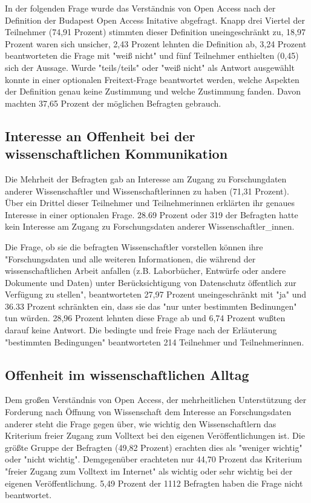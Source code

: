 In der folgenden Frage wurde das Verständnis von Open Access nach der Definition der Budapest Open Access Initative \cite{boai_2012} abgefragt. Knapp drei Viertel der Teilnehmer (74,91 Prozent) stimmten dieser Definition uneingeschränkt zu, 18,97 Prozent waren sich unsicher, 2,43 Prozent lehnten die Definition ab, 3,24 Prozent beantworteten die Frage mit "weiß nicht" und fünf Teilnehmer enthielten (0,45) sich der Aussage. Wurde "teils/teils" oder "weiß nicht" als Antwort ausgewählt konnte in einer optionalen Freitext-Frage beantwortet werden, welche Aspekten der Definition genau keine Zustimmung und welche Zustimmung fanden. Davon machten 37,65 Prozent der möglichen Befragten gebrauch.

\subsection{Interesse an Offenheit bei der wissenschaftlichen Kommunikation}

Die Mehrheit der Befragten gab an Interesse am Zugang zu Forschungdaten anderer Wissenschaftler und Wissenschaftlerinnen zu haben (71,31 Prozent). Über ein Drittel dieser Teilnehmer und Teilnehmerinnen erklärten ihr genaues Interesse in einer optionalen Frage. 28.69 Prozent oder 319 der Befragten hatte kein Interesse am Zugang zu Forschungsdaten anderer Wissenschaftler_innen.

Die Frage, ob sie die befragten Wissenschaftler vorstellen können ihre "Forschungsdaten und alle weiteren Informationen, die während der wissenschaftlichen Arbeit anfallen (z.B. Laborbücher, Entwürfe oder andere Dokumente und Daten) unter Berücksichtigung von Datenschutz öffentlich zur Verfügung zu stellen", beantworteten 27,97 Prozent uneingeschränkt mit "ja" und 36.33 Prozent schränkten ein, dass sie das "nur unter bestimmten Bedinungen" tun würden.  28,96 Prozent lehnten diese Frage ab und 6,74 Prozent wußten darauf keine Antwort. Die bedingte und freie Frage nach der Erläuterung "bestimmten Bedingungen" beantworteten 214 Teilnehmer und Teilnehmerinnen.

\subsection{Offenheit im wissenschaftlichen Alltag}

Dem großen Verständnis von Open Access, der mehrheitlichen Unterstützung der Forderung nach Öffnung von Wissenschaft dem Interesse an Forschungsdaten anderer steht die Frage gegen über, wie wichtig den Wissenschaftlern das Kriterium freier Zugang zum Volltext bei den eigenen Veröffentlichungen ist. Die größte Gruppe der Befragten (49,82 Prozent) erachten dies als "weniger wichtig" oder "nicht wichtig". Demgegenüber erachteten nur 44,70 Prozent das Kriterium "freier Zugang zum Volltext im Internet" als wichtig oder sehr wichtig bei der eigenen Veröffentlichung. 5,49 Prozent der 1112 Befragten haben die Frage nicht beantwortet.

